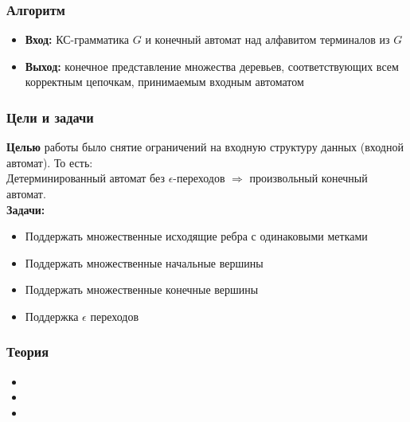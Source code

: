 \documentclass{beamer}
\begin{document}
\begin{frame}
  \transwipe[direction=90]
  \frametitle{Алгоритм}
  \begin{itemize}
    \item \textbf{Вход:}
        КС-грамматика $ G $ и конечный автомат над алфавитом терминалов из $ G $
    \item \textbf{Выход:}
        конечное представление множества деревьев,
        соответствующих всем корректным цепочкам, принимаемым
        входным автоматом
  \end{itemize}
\end{frame}


\begin{frame}
  \transwipe[direction=90]
  \frametitle{Цели и задачи}
  \textbf{Целью} работы было снятие ограничений на входную структуру данных (входной автомат). То есть:\\
  Детерминированный автомат без $\epsilon$-переходов $\Rightarrow$ произвольный конечный автомат. \\
  \textbf{Задачи:}
  \begin{itemize}
        \item Поддержать множественные исходящие ребра с одинаковыми метками
        \item Поддержать множественные начальные вершины
        \item Поддержать множественные конечные вершины
        \item Поддержка $\epsilon$ переходов
  \end{itemize}
\end{frame}

\begin{frame}
  \transwipe[direction=90]
  \frametitle{Теория}
  \begin{itemize}
    \item {}
    \item {}
    \item {}
  \end{itemize}
\end{frame}
\end{document}
